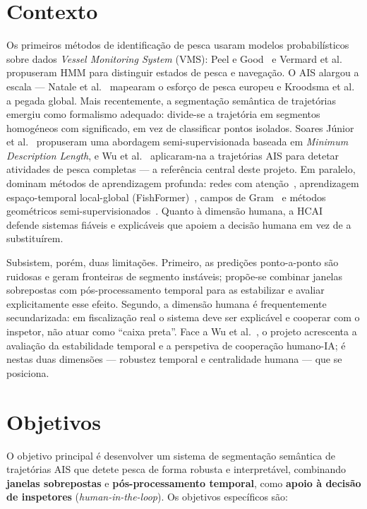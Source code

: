 \documentclass{article}
\begin{document}
\section{Contexto}
\label{sec:contexto}

Os primeiros métodos de identificação de pesca usaram modelos probabilísticos sobre dados \emph{Vessel Monitoring System} (VMS): Peel e Good~ e Vermard et al.~ propuseram HMM para distinguir estados de pesca e navegação. O AIS alargou a escala --- Natale et al.~ mapearam o esforço de pesca europeu e Kroodsma et al.~ a pegada global. Mais recentemente, a segmentação semântica de trajetórias emergiu como formalismo adequado: divide-se a trajetória em segmentos homogéneos com significado, em vez de classificar pontos isolados. Soares Júnior et al.~ propuseram uma abordagem semi-supervisionada baseada em \emph{Minimum Description Length}, e Wu et al.~ aplicaram-na a trajetórias AIS para detetar atividades de pesca completas --- a referência central deste projeto. Em paralelo, dominam métodos de aprendizagem profunda: redes com atenção~\cite{cheng2025}, aprendizagem espaço-temporal local-global (FishFormer)~\cite{wang2026}, campos de Gram~\cite{hu2026} e métodos geométricos semi-supervisionados~\cite{ferreira2022}. Quanto à dimensão humana, a HCAI~\cite{shneiderman2020} defende sistemas fiáveis e explicáveis que apoiem a decisão humana em vez de a substituírem.

Subsistem, porém, duas limitações. Primeiro, as predições ponto-a-ponto são ruidosas e geram fronteiras de segmento instáveis; propõe-se combinar janelas sobrepostas com pós-processamento temporal para as estabilizar e avaliar explicitamente esse efeito. Segundo, a dimensão humana é frequentemente secundarizada: em fiscalização real o sistema deve ser explicável e cooperar com o inspetor, não atuar como ``caixa preta''. Face a Wu et al.~, o projeto acrescenta a avaliação da estabilidade temporal e a perspetiva de cooperação humano-IA; é nestas duas dimensões --- robustez temporal e centralidade humana --- que se posiciona.

\section{Objetivos}
\label{sec:objetivos}

O objetivo principal é desenvolver um sistema de segmentação semântica de trajetórias AIS que detete pesca de forma robusta e interpretável, combinando \textbf{janelas sobrepostas} e \textbf{pós-processamento temporal}, como \textbf{apoio à decisão de inspetores} (\emph{human-in-the-loop}). Os objetivos específicos são:
\end{document}
